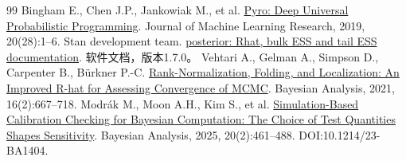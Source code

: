 \begin{thebibliography}{99}
 Bingham E., Chen J.P., Jankowiak M., et al. \href{https://jmlr.org/papers/v20/18-403.html}{Pyro: Deep Universal Probabilistic Programming}. Journal of Machine Learning Research, 2019, 20(28):1--6.
 Stan development team. \href{https://mc-stan.org/posterior/reference/rhat.html}{posterior: Rhat, bulk ESS and tail ESS documentation}. 软件文档，版本1.7.0。
 Vehtari A., Gelman A., Simpson D., Carpenter B., Bürkner P.-C. \href{https://doi.org/10.1214/20-BA1221}{Rank-Normalization, Folding, and Localization: An Improved R-hat for Assessing Convergence of MCMC}. Bayesian Analysis, 2021, 16(2):667--718.
 Modrák M., Moon A.H., Kim S., et al. \href{https://doi.org/10.1214/23-BA1404}{Simulation-Based Calibration Checking for Bayesian Computation: The Choice of Test Quantities Shapes Sensitivity}. Bayesian Analysis, 2025, 20(2):461--488. DOI:10.1214/23-BA1404.
\end{thebibliography}
